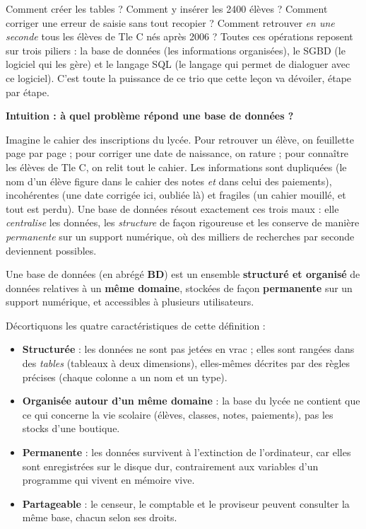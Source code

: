 \documentclass[11pt]{article}
\newcommand{\cle}[1]{{\popxbold\color{popdark}#1}}
\newcounter{popsec}
\newcounter{popsub}
\newcommand{\courssub}[1]{%
  \stepcounter{popsub}%
  \par\vspace{9pt}\noindent{\popxbold\fontsize{11.5}{13}\selectfont\color{popink}{\color{poporange}\thepopsec.\thepopsub}\hspace{6pt}#1}\par\nopagebreak\vspace{4pt}
}
\begin{document}
Comment créer les tables ? Comment y insérer les \num{2400} élèves ? Comment corriger une erreur de saisie sans tout recopier ? Comment retrouver \emph{en une seconde} tous les élèves de Tle C nés après 2006 ? Toutes ces opérations reposent sur trois piliers : la \cle{base de données} (les informations organisées), le \cle{SGBD} (le logiciel qui les gère) et le langage \cle{SQL} (le langage qui permet de dialoguer avec ce logiciel). C'est toute la puissance de ce trio que cette leçon va dévoiler, étape par étape.

\courssub{Notion de base de données}

\textbf{Intuition : à quel problème répond une base de données ?}\par
Imagine le cahier des inscriptions du lycée. Pour retrouver un élève, on feuillette page par page ; pour corriger une date de naissance, on rature ; pour connaître les élèves de Tle C, on relit tout le cahier. Les informations sont dupliquées (le nom d'un élève figure dans le cahier des notes \emph{et} dans celui des paiements), incohérentes (une date corrigée ici, oubliée là) et fragiles (un cahier mouillé, et tout est perdu). Une base de données résout exactement ces trois maux : elle \emph{centralise} les données, les \emph{structure} de façon rigoureuse et les conserve de manière \emph{permanente} sur un support numérique, où des milliers de recherches par seconde deviennent possibles.

\begin{definition}
Une \cle{base de données} (en abrégé \textbf{BD}) est un ensemble \textbf{structuré et organisé} de données relatives à un \textbf{même domaine}, stockées de façon \textbf{permanente} sur un support numérique, et accessibles à plusieurs utilisateurs.
\end{definition}

Décortiquons les quatre caractéristiques de cette définition :

\begin{itemize}
\item \textbf{Structurée} : les données ne sont pas jetées en vrac ; elles sont rangées dans des \emph{tables} (tableaux à deux dimensions), elles-mêmes décrites par des règles précises (chaque colonne a un nom et un type).
\item \textbf{Organisée autour d'un même domaine} : la base du lycée ne contient que ce qui concerne la vie scolaire (élèves, classes, notes, paiements), pas les stocks d'une boutique.
\item \textbf{Permanente} : les données survivent à l'extinction de l'ordinateur, car elles sont enregistrées sur le disque dur, contrairement aux variables d'un programme qui vivent en mémoire vive.
\item \textbf{Partageable} : le censeur, le comptable et le proviseur peuvent consulter la même base, chacun selon ses droits.
\end{itemize}
\end{document}
